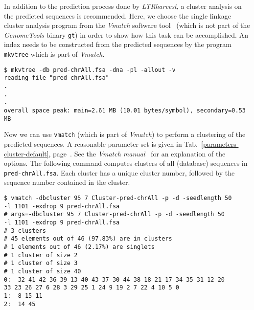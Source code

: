 \documentclass[12pt,titlepage]{article}
\newcommand{\LTRharvest}{\textit{LTRharvest}\xspace}
\newcommand{\GenomeTools}{\textit{GenomeTools}\xspace}
\newcommand{\Gt}{\texttt{gt}\xspace}
\begin{document}
In addition to the prediction process done by \LTRharvest,
a cluster analysis on the predicted
sequences is recommended. Here, we choose the single linkage cluster
analysis program from the
\textit{Vmatch} software tool~\cite{vmatch}
(which is not part of the \GenomeTools binary \Gt)
in order to show how this task can be accomplished.
An index needs to be constructed from the predicted sequences by the program
\texttt{mkvtree} which is part of \textit{Vmatch}.

\begin{footnotesize}
\begin{verbatim}
$ mkvtree -db pred-chrAll.fsa -dna -pl -allout -v
reading file "pred-chrAll.fsa"
.
.
.
overall space peak: main=2.61 MB (10.01 bytes/symbol), secondary=0.53 MB
\end{verbatim}
\end{footnotesize}

Now we can use \texttt{vmatch} (which is part of \textit{Vmatch})
to perform a clustering of the predicted sequences.
A reasonable parameter set is given in
Tab.~\ref{parameters-cluster-default},
page~\pageref{parameters-cluster-default}.
See the \emph{Vmatch manual}~\cite{vmatch} for an explanation of the
options. The following command computes clusters of all (database) sequences in
\texttt{\small{pred-chrAll.fsa}}. Each cluster has a unique cluster number,
followed by the sequence number contained in the cluster.

\begin{footnotesize}
\begin{verbatim}
$ vmatch -dbcluster 95 7 Cluster-pred-chrAll -p -d -seedlength 50
-l 1101 -exdrop 9 pred-chrAll.fsa
# args=-dbcluster 95 7 Cluster-pred-chrAll -p -d -seedlength 50
-l 1101 -exdrop 9 pred-chrAll.fsa
# 3 clusters
# 45 elements out of 46 (97.83%) are in clusters
# 1 elements out of 46 (2.17%) are singlets
# 1 cluster of size 2
# 1 cluster of size 3
# 1 cluster of size 40
0:  32 41 42 36 39 13 40 43 37 30 44 38 18 21 17 34 35 31 12 20
33 23 26 27 6 28 3 29 25 1 24 9 19 2 7 22 4 10 5 0
1:  8 15 11
2:  14 45
\end{verbatim}
\end{footnotesize}
\end{document}
